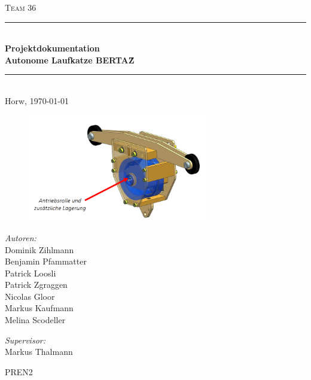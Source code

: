 \begin{titlepage}   

\begin{center}
\textsc{\Large Team 36}\\[0.5cm]

\newcommand{\HRule}{\rule{\linewidth}{0.5mm}}
\HRule \\[0.4cm]
{ \huge \bfseries Projektdokumentation}\\[0.4cm]
{ \LARGE \bfseries Autonome Laufkatze BERTA\^Z}\\[0.4cm]
\HRule \\[1.5cm]

{\large Horw, \today}

\begin{figure}[H]%
\centering
\includegraphics[width=0.7\textwidth]{Images/Titelbild.png}
\label{fig:title}
\end{figure}
\begin{minipage}{0.4\textwidth}
\begin{flushleft} \large
\emph{Autoren:}\\
Dominik Zihlmann\\
Benjamin Pfammatter\\
Patrick Loosli\\
Patrick Zgraggen\\
Nicolas Gloor\\
Markus Kaufmann\\
Melina Scodeller\\
\end{flushleft}
\end{minipage}
\hfill
\begin{minipage}{0.4\textwidth}
\begin{flushright} \large
\emph{Supervisor:} \\
Markus Thalmann
\end{flushright}
\end{minipage}
\large
\vfill
PREN2 \\

\end{center}

\end{titlepage}
